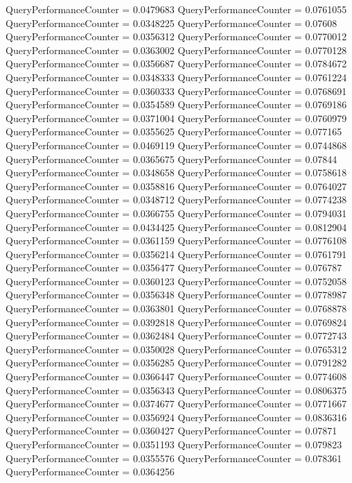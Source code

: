 \documentclass[9pt]{article}
\theoremstyle{plain}
\theoremstyle{definition}
\theoremstyle{remark}
\numberwithin{equation}{section}
\begin{document}
QueryPerformanceCounter  =  0.0479683
QueryPerformanceCounter  =  0.0761055
QueryPerformanceCounter  =  0.0348225
QueryPerformanceCounter  =  0.07608
QueryPerformanceCounter  =  0.0356312
QueryPerformanceCounter  =  0.0770012
QueryPerformanceCounter  =  0.0363002
QueryPerformanceCounter  =  0.0770128
QueryPerformanceCounter  =  0.0356687
QueryPerformanceCounter  =  0.0784672
QueryPerformanceCounter  =  0.0348333
QueryPerformanceCounter  =  0.0761224
QueryPerformanceCounter  =  0.0360333
QueryPerformanceCounter  =  0.0768691
QueryPerformanceCounter  =  0.0354589
QueryPerformanceCounter  =  0.0769186
QueryPerformanceCounter  =  0.0371004
QueryPerformanceCounter  =  0.0760979
QueryPerformanceCounter  =  0.0355625
QueryPerformanceCounter  =  0.077165
QueryPerformanceCounter  =  0.0469119
QueryPerformanceCounter  =  0.0744868
QueryPerformanceCounter  =  0.0365675
QueryPerformanceCounter  =  0.07844
QueryPerformanceCounter  =  0.0348658
QueryPerformanceCounter  =  0.0758618
QueryPerformanceCounter  =  0.0358816
QueryPerformanceCounter  =  0.0764027
QueryPerformanceCounter  =  0.0348712
QueryPerformanceCounter  =  0.0774238
QueryPerformanceCounter  =  0.0366755
QueryPerformanceCounter  =  0.0794031
QueryPerformanceCounter  =  0.0434425
QueryPerformanceCounter  =  0.0812904
QueryPerformanceCounter  =  0.0361159
QueryPerformanceCounter  =  0.0776108
QueryPerformanceCounter  =  0.0356214
QueryPerformanceCounter  =  0.0761791
QueryPerformanceCounter  =  0.0356477
QueryPerformanceCounter  =  0.076787
QueryPerformanceCounter  =  0.0360123
QueryPerformanceCounter  =  0.0752058
QueryPerformanceCounter  =  0.0356348
QueryPerformanceCounter  =  0.0778987
QueryPerformanceCounter  =  0.0363801
QueryPerformanceCounter  =  0.0768878
QueryPerformanceCounter  =  0.0392818
QueryPerformanceCounter  =  0.0769824
QueryPerformanceCounter  =  0.0362484
QueryPerformanceCounter  =  0.0772743
QueryPerformanceCounter  =  0.0350028
QueryPerformanceCounter  =  0.0765312
QueryPerformanceCounter  =  0.0356285
QueryPerformanceCounter  =  0.0791282
QueryPerformanceCounter  =  0.0366447
QueryPerformanceCounter  =  0.0774608
QueryPerformanceCounter  =  0.0356343
QueryPerformanceCounter  =  0.0806375
QueryPerformanceCounter  =  0.0374677
QueryPerformanceCounter  =  0.0771667
QueryPerformanceCounter  =  0.0356924
QueryPerformanceCounter  =  0.0836316
QueryPerformanceCounter  =  0.0360427
QueryPerformanceCounter  =  0.07871
QueryPerformanceCounter  =  0.0351193
QueryPerformanceCounter  =  0.079823
QueryPerformanceCounter  =  0.0355576
QueryPerformanceCounter  =  0.078361
QueryPerformanceCounter  =  0.0364256
\end{document}
